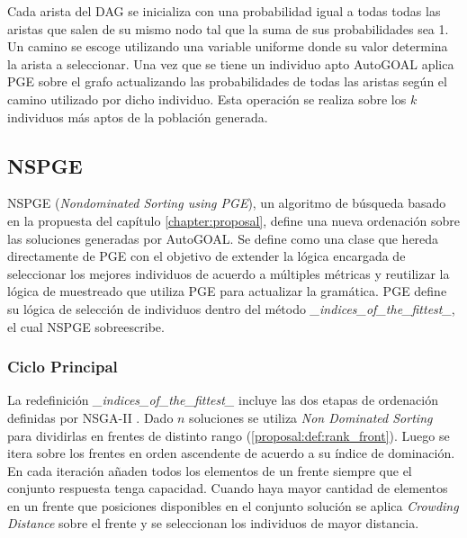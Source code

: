 Cada arista del DAG se inicializa con una probabilidad igual a todas todas las aristas que salen de su mismo nodo tal que la suma de sus probabilidades sea 1. Un camino se escoge utilizando una variable uniforme donde su valor determina la arista a seleccionar.
Una vez que se tiene un individuo apto AutoGOAL aplica PGE sobre el grafo actualizando las probabilidades de todas las aristas seg\'un el camino utilizado por dicho individuo. Esta operaci\'on se realiza sobre los $k$ individuos m\'as aptos de la poblaci\'on generada. %

\subsection{NSPGE}
NSPGE (\textit{Nondominated Sorting using PGE}), un algoritmo de b\'usqueda basado en la propuesta del cap\'itulo \ref{chapter:proposal}, define una nueva ordenaci\'on sobre las soluciones generadas por AutoGOAL. Se define como una clase que hereda directamente de PGE con el objetivo de extender la l\'ogica encargada de seleccionar los mejores individuos de acuerdo a m\'ultiples m\'etricas y reutilizar la l\'ogica de muestreado que utiliza PGE para actualizar la gram\'atica. PGE define su l\'ogica de selecci\'on de individuos dentro del m\'etodo \textit{\_indices\_of\_the\_fittest\_}, el cual NSPGE sobreescribe.

\subsubsection{Ciclo Principal}
La redefinici\'on \textit{\_indices\_of\_the\_fittest\_} incluye las dos etapas de ordenaci\'on definidas por NSGA-II . Dado $n$ soluciones se utiliza \textit{Non Dominated Sorting} para dividirlas en frentes de distinto rango (\ref{proposal:def:rank_front}). Luego se itera sobre los frentes en orden ascendente de acuerdo a su \'indice de dominaci\'on. En cada iteraci\'on a\~naden todos los elementos de un frente siempre que el conjunto respuesta tenga capacidad. Cuando haya  mayor cantidad de elementos en un frente que posiciones disponibles en el conjunto soluci\'on se aplica \textit{Crowding Distance} sobre el frente y se seleccionan los individuos de mayor distancia.

